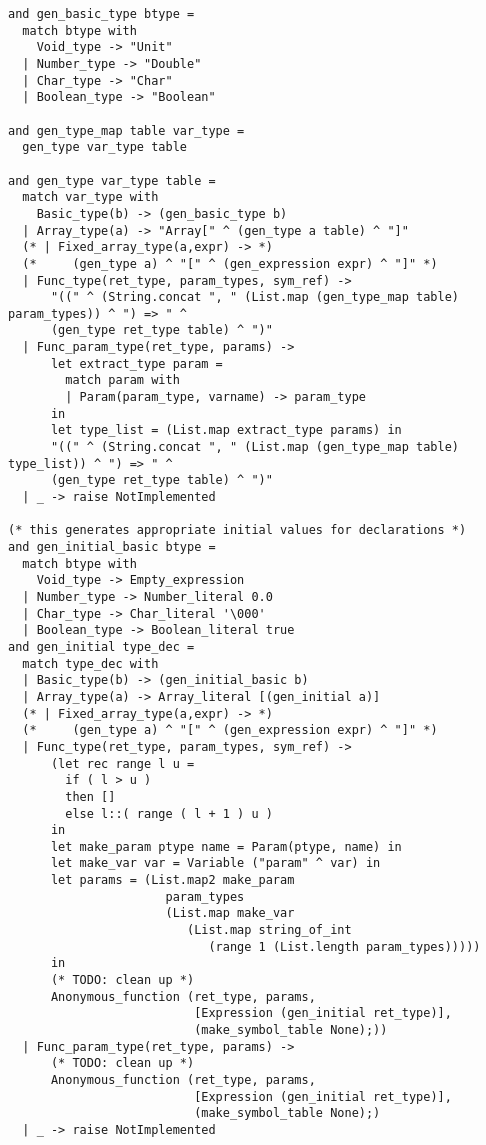 \begin{verbatim}
and gen_basic_type btype =
  match btype with
    Void_type -> "Unit"
  | Number_type -> "Double"
  | Char_type -> "Char"
  | Boolean_type -> "Boolean"

and gen_type_map table var_type =
  gen_type var_type table

and gen_type var_type table =
  match var_type with
    Basic_type(b) -> (gen_basic_type b)
  | Array_type(a) -> "Array[" ^ (gen_type a table) ^ "]"
  (* | Fixed_array_type(a,expr) -> *)
  (*     (gen_type a) ^ "[" ^ (gen_expression expr) ^ "]" *)
  | Func_type(ret_type, param_types, sym_ref) ->
      "((" ^ (String.concat ", " (List.map (gen_type_map table) param_types)) ^ ") => " ^
      (gen_type ret_type table) ^ ")"
  | Func_param_type(ret_type, params) ->
      let extract_type param = 
        match param with
        | Param(param_type, varname) -> param_type
      in
      let type_list = (List.map extract_type params) in
      "((" ^ (String.concat ", " (List.map (gen_type_map table) type_list)) ^ ") => " ^
      (gen_type ret_type table) ^ ")"
  | _ -> raise NotImplemented

(* this generates appropriate initial values for declarations *)
and gen_initial_basic btype =
  match btype with
    Void_type -> Empty_expression
  | Number_type -> Number_literal 0.0
  | Char_type -> Char_literal '\000'
  | Boolean_type -> Boolean_literal true
and gen_initial type_dec =
  match type_dec with
  | Basic_type(b) -> (gen_initial_basic b)
  | Array_type(a) -> Array_literal [(gen_initial a)]
  (* | Fixed_array_type(a,expr) -> *)
  (*     (gen_type a) ^ "[" ^ (gen_expression expr) ^ "]" *)
  | Func_type(ret_type, param_types, sym_ref) ->
      (let rec range l u =
        if ( l > u )
        then []
        else l::( range ( l + 1 ) u )
      in
      let make_param ptype name = Param(ptype, name) in
      let make_var var = Variable ("param" ^ var) in
      let params = (List.map2 make_param
                      param_types
                      (List.map make_var
                         (List.map string_of_int
                            (range 1 (List.length param_types)))))
      in
      (* TODO: clean up *)
      Anonymous_function (ret_type, params,
                          [Expression (gen_initial ret_type)],
                          (make_symbol_table None);))
  | Func_param_type(ret_type, params) ->
      (* TODO: clean up *)
      Anonymous_function (ret_type, params,
                          [Expression (gen_initial ret_type)],
                          (make_symbol_table None);)
  | _ -> raise NotImplemented


\end{verbatim}
